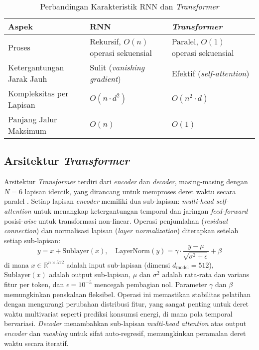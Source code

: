 \begin{table}[H]
\centering
\caption{Perbandingan Karakteristik RNN dan \textit{Transformer}}
\label{tab:rnn_vs_transformer}
\begin{tabularx}{\textwidth}{>{\raggedright\arraybackslash}X>{\raggedright\arraybackslash}X>{\raggedright\arraybackslash}X}
\toprule
\textbf{Aspek} & \textbf{RNN} & \textbf{\textit{Transformer}} \\
\midrule
Proses & Rekursif, \( O(n) \) operasi sekuensial & Paralel, \( O(1) \) operasi sekuensial \\
Ketergantungan Jarak Jauh & Sulit (\textit{vanishing gradient}) & Efektif (\textit{self-attention}) \\
Kompleksitas per Lapisan & \( O(n \cdot d^2) \) & \( O(n^2 \cdot d) \) \\
Panjang Jalur Maksimum & \( O(n) \) & \( O(1) \) \\
\bottomrule
\end{tabularx}
\end{table}

\subsection{Arsitektur \textit{Transformer}}
Arsitektur \textit{Transformer} terdiri dari \textit{encoder} dan \textit{decoder}, masing-masing dengan \( N=6 \) lapisan identik, yang dirancang untuk memproses deret waktu secara paralel \citep{Vaswani2017}. Setiap lapisan \textit{encoder} memiliki dua sub-lapisan: \textit{multi-head self-attention} untuk menangkap ketergantungan temporal dan jaringan \textit{feed-forward} posisi-\textit{wise} untuk transformasi non-linear. Operasi penjumlahan (\textit{residual connection}) dan normalisasi lapisan (\textit{layer normalization}) diterapkan setelah setiap sub-lapisan:
\begin{equation}
y = x + \text{Sublayer}(x), \quad \text{LayerNorm}(y) = \gamma \cdot \frac{y - \mu}{\sqrt{\sigma^2 + \epsilon}} + \beta
\end{equation}
di mana \( x \in \mathbb{R}^{n \times 512} \) adalah input sub-lapisan (dimensi \( d_{\text{model}} = 512 \)), \(\text{Sublayer}(x)\) adalah output sub-lapisan, \( \mu \) dan \( \sigma^2 \) adalah rata-rata dan varians fitur per token, dan \( \epsilon = 10^{-5} \) mencegah pembagian nol. Parameter \( \gamma \) dan \( \beta \) memungkinkan penskalaan fleksibel. Operasi ini memastikan stabilitas pelatihan dengan mengurangi perubahan distribusi fitur, yang sangat penting untuk deret waktu multivariat seperti prediksi konsumsi energi, di mana pola temporal bervariasi. \textit{Decoder} menambahkan sub-lapisan \textit{multi-head attention} atas output \textit{encoder} dan \textit{masking} untuk sifat auto-regresif, memungkinkan peramalan deret waktu secara iteratif.

